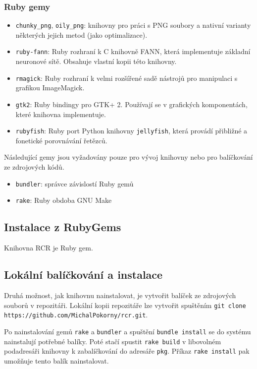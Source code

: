 \documentclass[a4paper]{article}
\def\githuburl{git clone https://github.com/MichalPokorny/rcr.git}
\begin{document}
\subsubsection{Ruby gemy}
\begin{itemize}
\item \texttt{chunky\_png}, \texttt{oily\_png}: knihovny pro práci s PNG soubory
	a nativní varianty některých jejich metod (jako optimalizace).
\item \texttt{ruby-fann}: Ruby rozhraní k C knihovně FANN, která implementuje
	základní neuronové sítě. Obsahuje vlastní kopii této knihovny.
\item \texttt{rmagick}: Ruby rozhraní k velmi rozšířené sadě nástrojů pro
	manipulaci s grafikou ImageMagick.
\item \texttt{gtk2}: Ruby bindingy pro GTK+ 2. Používají se v grafických
	komponentách, které knihovna implementuje.
\item \texttt{rubyfish}: Ruby port Python knihovny \texttt{jellyfish}, která
	provádí přibližné a fonetické porovnávání řetězců.
\end{itemize}

Následující gemy jsou vyžadovány pouze pro vývoj knihovny nebo pro balíčkování
ze zdrojových kódů.
\begin{itemize}
\item \texttt{bundler}: správce závislostí Ruby gemů
\item \texttt{rake}: Ruby obdoba GNU Make
\end{itemize}

\subsection{Instalace z RubyGems}
Knihovna RCR je Ruby gem.

\subsection{Lokální balíčkování a instalace}
Druhá možnost, jak knihovnu nainstalovat, je vytvořit balíček ze zdrojových
souborů v repozitáři. Lokální kopii repozitáře lze vytvořit spuštěním
\texttt{\githuburl}.

Po nainstalování gemů \texttt{rake} a \texttt{bundler} a spuštění
\texttt{bundle install} se do systému nainstalují potřebné balíky. Poté
stačí spustit \texttt{rake build} v libovolném podadresáři knihovny
k zabalíčkování do adresáře \texttt{pkg}. Příkaz \texttt{rake install} pak
umožňuje tento balík nainstalovat.
\end{document}
